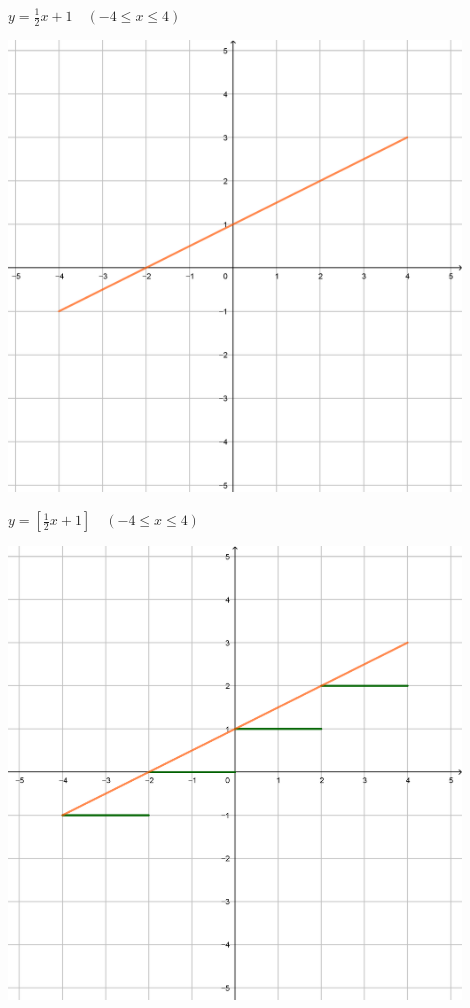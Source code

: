 \documentclass[a4paper]{oblivoir}
\begin{document}
\newpage
\begin{minipage}{0.45\textwidth}\centering
\(y=\frac12x+1\quad(-4\le x\le4)\)
\par\bigskip\includegraphics[width=0.9\textwidth]{img/y=.5x+1}
\end{minipage}
\begin{minipage}{0.45\textwidth}\centering
\(y=[\frac12x+1]\quad(-4\le x\le4)\)
\par\bigskip\includegraphics[width=0.9\textwidth]{img/y=[.5x+1]}
\end{minipage}\bigskip\bigskip\par
\end{document}
